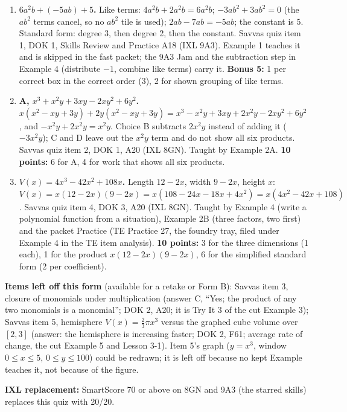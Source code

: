 \documentclass[11pt]{article}
\begin{document}
\begin{enumerate}
\item[\textbf{1.}] \textbf{$6a^2b+(-5ab)+5$.} Like terms: $4a^2b+2a^2b=6a^2b$; $-3ab^2+3ab^2=0$ (the $ab^2$ terms cancel, so no $ab^2$ tile is used); $2ab-7ab=-5ab$; the constant is $5$. Standard form: degree 3, then degree 2, then the constant. Savvas quiz item 1, DOK 1, Skills Review and Practice A18 (IXL 9A3). Example 1 teaches it and is skipped in the fast packet; the 9A3 Jam and the subtraction step in Example 4 (distribute $-1$, combine like terms) carry it. \textbf{Bonus 5:} 1 per correct box in the correct order (3), 2 for shown grouping of like terms.
\item[\textbf{2.}] \textbf{A, $x^3+x^2y+3xy-2xy^2+6y^2$.} $x(x^2-xy+3y)+2y(x^2-xy+3y)=x^3-x^2y+3xy+2x^2y-2xy^2+6y^2$, and $-x^2y+2x^2y=x^2y$. Choice B subtracts $2x^2y$ instead of adding it ($-3x^2y$); C and D leave out the $x^2y$ term and do not show all six products. Savvas quiz item 2, DOK 1, A20 (IXL 8GN). Taught by Example 2A. \textbf{10 points:} 6 for A, 4 for work that shows all six products.
\item[\textbf{4.}] \textbf{$V(x)=4x^3-42x^2+108x$.} Length $12-2x$, width $9-2x$, height $x$: $V(x)=x(12-2x)(9-2x)=x(108-24x-18x+4x^2)=x(4x^2-42x+108)$. Savvas quiz item 4, DOK 3, A20 (IXL 8GN). Taught by Example 4 (write a polynomial function from a situation), Example 2B (three factors, two first) and the packet Practice (TE Practice 27, the foundry tray, filed under Example 4 in the TE item analysis). \textbf{10 points:} 3 for the three dimensions (1 each), 1 for the product $x(12-2x)(9-2x)$, 6 for the simplified standard form (2 per coefficient).
\end{enumerate}

\textbf{Items left off this form} (available for a retake or Form B): Savvas item 3, closure of monomials under multiplication (answer C, ``Yes; the product of any two monomials is a monomial''; DOK 2, A20; it is Try It 3 of the cut Example 3); Savvas item 5, hemisphere $V(x)=\tfrac23\pi x^3$ versus the graphed cube volume over $[2,3]$ (answer: the hemisphere is increasing faster; DOK 2, F61; average rate of change, the cut Example 5 and Lesson 3-1). Item 5's graph ($y=x^3$, window $0\le x\le5$, $0\le y\le100$) could be redrawn; it is left off because no kept Example teaches it, not because of the figure.

\textbf{IXL replacement:} SmartScore 70 or above on 8GN and 9A3 (the starred skills) replaces this quiz with 20/20.
\end{document}

